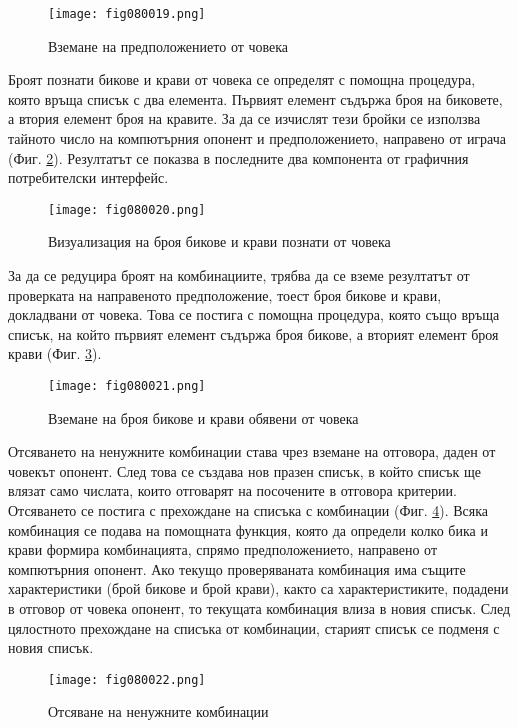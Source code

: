 \begin{figure}[H]
  \centering
  \texttt{[image: fig080019.png]}
  \caption{Вземане на предположението от човека}
\label{fig080019}
\end{figure}

Броят познати бикове и крави от човека се определят с помощна процедура, която връща списък с два елемента. Първият елемент съдържа броя на биковете, а втория елемент броя на кравите. За да се изчислят тези бройки се използва тайното число на компютърния опонент и предположението, направено от играча (Фиг. \ref{fig080020}). Резултатът се показва в последните два компонента от графичния потребителски интерфейс.

\begin{figure}[H]
  \centering
  \texttt{[image: fig080020.png]}
  \caption{Визуализация на броя бикове и крави познати от човека}
\label{fig080020}
\end{figure}

За да се редуцира броят на комбинациите, трябва да се вземе резултатът от проверката на направеното предположение, тоест броя бикове и крави, докладвани от човека. Това се постига с помощна процедура, която също връща списък, на който първият елемент съдържа броя бикове, а вторият елемент броя крави (Фиг. \ref{fig080021}).

\begin{figure}[H]
  \centering
  \texttt{[image: fig080021.png]}
  \caption{Вземане на броя бикове и крави обявени от човека}
\label{fig080021}
\end{figure}

Отсяването на ненужните комбинации става чрез вземане на отговора, даден от човекът опонент. След това се създава нов празен списък, в който списък ще влязат само числата, които отговарят на посочените в отговора критерии. Отсяването се постига с прехождане на списъка с комбинации (Фиг. \ref{fig080022}). Всяка комбинация се подава на помощната функция, която да определи колко бика и крави формира комбинацията, спрямо предположението, направено от компютърния опонент. Ако текущо проверяваната комбинация има същите характеристики (брой бикове и брой крави), както са характеристиките, подадени в отговор от човека опонент, то текущата комбинация влиза в новия списък. След цялостното прехождане на списъка от комбинации, старият списък се подменя с новия списък.

\begin{figure}[H]
  \centering
  \texttt{[image: fig080022.png]}
  \caption{Отсяване на ненужните комбинации}
\label{fig080022}
\end{figure}

